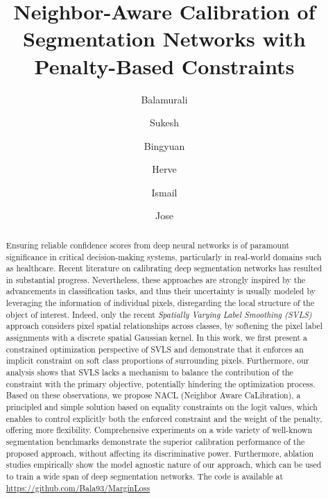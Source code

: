 \documentclass[twocolumn,final,10pt]{elsarticle}
\title{Neighbor-Aware Calibration of Segmentation Networks with Penalty-Based Constraints}
\author[1]{Balamurali \snm{Murugesan}\corref{cor1}}
\author[1]{Sukesh \snm{Adiga Vasudeva}}
\author[2]{Bingyuan \snm{Liu}}
\author[1]{Herve \snm{Lombaert}}
\author[1]{Ismail \snm{Ben Ayed}}
\author[1]{Jose \snm{Dolz}}
\newcommand{\rev}[1]{{\color{black}#1}}
\begin{document}
\begin{frontmatter}
\begin{abstract}

    
Ensuring reliable confidence scores from %
deep neural networks is of paramount significance in critical decision-making systems, particularly in real-world domains such as healthcare. 
Recent literature on calibrating deep segmentation networks has resulted in substantial progress. Nevertheless, these approaches are strongly inspired by the advancements in classification tasks, and thus their uncertainty %
is usually modeled by leveraging the information of individual pixels, disregarding the local structure of the object of interest. Indeed, only the recent \textit{Spatially Varying Label Smoothing (SVLS)} approach considers pixel spatial relationships across classes, by softening the pixel label assignments with a discrete spatial Gaussian kernel. In this work, we first present a constrained optimization perspective of SVLS and demonstrate that it enforces an implicit constraint on soft class proportions of surrounding pixels. Furthermore, our analysis shows that SVLS lacks a mechanism to balance the contribution of the constraint with the primary objective, potentially hindering the optimization process. %
Based on these observations, %
we propose \rev{NACL (Neighbor Aware CaLibration)}, 
a principled and simple solution based on equality constraints on the logit values, which enables to control explicitly both the enforced constraint and the weight of the penalty, offering more flexibility. Comprehensive experiments on a wide variety of well-known segmentation benchmarks demonstrate the superior calibration performance of the proposed approach, without affecting its discriminative power. Furthermore, ablation studies empirically show the model agnostic nature of our approach, which can be used to train a wide span of deep segmentation networks. 
The code is available at \url{https://github.com/Bala93/MarginLoss}

\end{abstract}


\begin{keyword}
\end{keyword}
\end{frontmatter}
\end{document}
